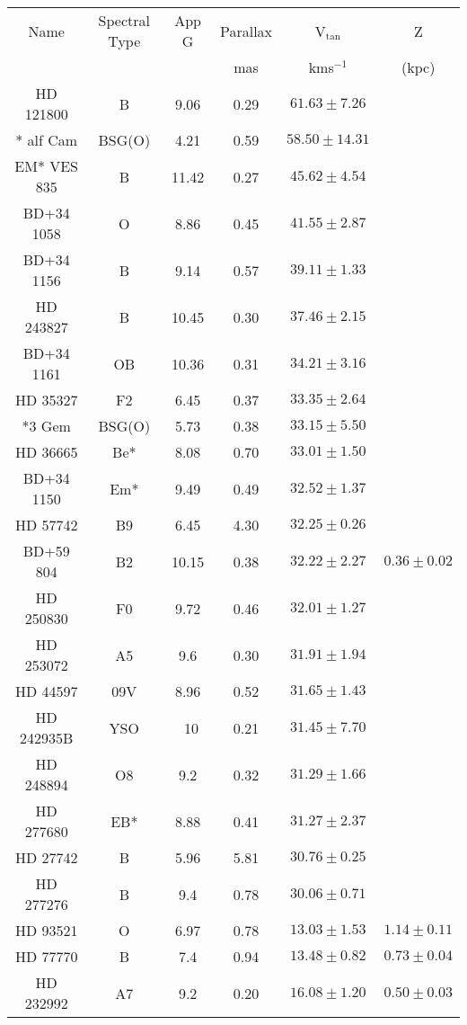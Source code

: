 \documentclass[fleqn,usenatbib]{mnras}
\begin{document}
\begin{table}

 \begin{center}
\renewcommand{\arraystretch}{1.3}
\hspace*{-1cm}
\begin{tabular}{c c c c c c} 
\hline
\hline
Name & Spectral Type&App G&Parallax &V$_{\text{tan}}$ & Z \\
 &&&mas&kms$^{-1}$&  (kpc)\\
\hline
HD 121800 & B&9.06&0.29 & $61.63\pm 7.26$ &\\
* alf Cam& BSG(O)&4.21&0.59& $58.50\pm 14.31$ &\\
EM* VES  835& B&11.42& 0.27& $45.62\pm 4.54$ &\\
BD+34 1058 &O&8.86 &0.45 & $41.55 \pm  2.87$&\\
BD+34 1156 & B&9.14& 0.57& $39.11 \pm  1.33$&\\
HD 243827 &B&10.45 & 0.30 & $37.46 \pm 2.15$&\\
BD+34 1161&OB&10.36& 0.31& $34.21 \pm 3.16$&\\
HD 35327 &F2&6.45& 0.37 & $33.35 \pm 2.64$ &\\
*3 Gem & BSG(O)&5.73 &0.38 & $33.15 \pm 5.50$&\\
HD 36665 & Be* & 8.08& 0.70 & $33.01 \pm 1.50$&\\
BD+34 1150 & Em* &9.49& 0.49& $32.52 \pm 1.37$ &\\
HD 57742 &B9&6.45& 4.30 & $32.25 \pm  0.26$& \\
BD+59 804&B2&10.15& 0.38 & $32.22 \pm  2.27$&$0.36 \pm 0.02$\\
HD 250830 & F0	&9.72&0.46& $32.01 \pm  1.27$&\\
HD 253072 & A5&	9.6&0.30 & $31.91 \pm  1.94$& \\
HD 44597 &09V&	8.96 &0.52 & $31.65 \pm 1.43$&\\
HD 242935B &YSO	&~10 &0.21 & $31.45 \pm  7.70$&\\
HD 248894&O8&9.2 & 0.32  &$31.29 \pm  1.66$&\\
HD 277680 &EB*	&8.88 &0.41&  $31.27\pm 2.37$& \\
HD  27742 &B &5.96 &5.81& $30.76 \pm 0.25 $&\\
HD 277276&B	&9.4 & 0.78&$30.06\pm 0.71$&\\
\hline
HD 93521 &O	&6.97 &0.78& $13.03\pm 1.53$& $1.14\pm 0.11$\\
HD 77770 &B	&7.4& 0.94 & $13.48\pm 0.82$& $0.73 \pm 0.04$\\
HD 232992 &A7&9.2& 0.20 & $16.08\pm 1.20$& $0.50\pm 0.03$\\

\end{tabular}
\end{center}
\end{table}
\end{document}
